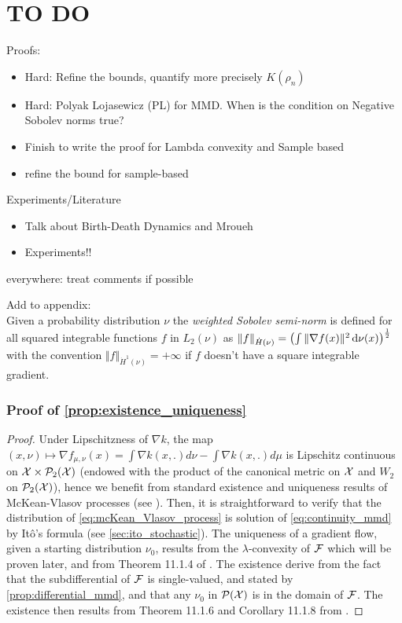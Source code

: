 
\section*{TO DO}

Proofs:
\begin{itemize}
	\item Hard: Refine the bounds, quantify more precisely $K(\rho_n)$
	\item Hard: Polyak Lojasewicz (PL) for MMD. When is the condition on Negative Sobolev norms true?
	\item Finish to write the proof for Lambda convexity and Sample based
	\item refine the bound for sample-based
\end{itemize}


Experiments/Literature
\begin{itemize}
	\item Talk about Birth-Death Dynamics and Mroueh
	\item Experiments!!
\end{itemize}
everywhere: treat comments if possible

Add to appendix:\\

Given a probability distribution $\nu$ the \textit{weighted Sobolev semi-norm} is defined for all squared integrable functions $f$ in $L_2(\nu)$ as $ \Vert f \Vert_{\dot{H}(\nu)} = \left(\int \Vert \nabla f(x) \Vert^2 \mathop{}\!\mathrm{d} \nu(x) \right)^{\frac{1}{2}}$ with the convention $\Vert f \Vert_{\dot{H}^1(\nu)} = +\infty$ if $f$ doesn't have a square integrable gradient.

\subsubsection{Proof of \cref{prop:existence_uniqueness}}

\begin{proof}
	Under Lipschitzness of $\nabla k$, the map $(x,\nu)\mapsto \nabla f_{\mu,\nu}(x)=\int \nabla k(x,.)d \nu - \int \nabla k(x,.) d \mu$ is Lipschitz continuous on ${{\mathcal X}} \times \mathcal{P}_2({{\mathcal X}})$ (endowed with the product of the canonical metric on ${{\mathcal X}}$ and $W_2$ on $\mathcal{P}_2({{\mathcal X}})$), hence we benefit from standard existence and uniqueness results of McKean-Vlasov processes (see \cite{Jourdain:2007}). Then, it is straightforward to verify that the distribution of \eqref{eq:mcKean_Vlasov_process} is solution of \eqref{eq:continuity_mmd} by Itô's formula (see \cref{sec:ito_stochastic}). The uniqueness of a gradient flow, given a starting distribution $\nu_0$, results from the $\lambda$-convexity of ${{\mathcal F}}$ which will be proven later, and from Theorem 11.1.4 of \cite{ambrosio2008gradient}. The existence derive from the fact that the subdifferential of ${{\mathcal F}}$ is single-valued, and stated by \cref{prop:differential_mmd}, and that any $\nu_0$ in $\mathcal{P}({{\mathcal X}})$ is in the domain of ${{\mathcal F}}$. The existence then results from Theorem 11.1.6 and Corollary 11.1.8 from \cite{ambrosio2008gradient}.
\end{proof}